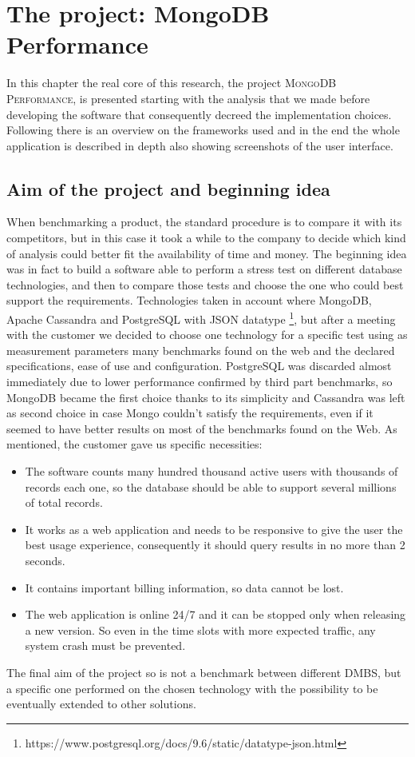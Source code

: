 \chapter{The project: MongoDB Performance}
\label{cha:3}
In this chapter the real core of this research, the project \textsc{MongoDB Performance}, is presented starting with the analysis  that we made before developing the software that consequently decreed the implementation choices.
Following there is an overview on the frameworks used and in the end the whole application is described in depth also showing screenshots of the user interface.

\section{Aim of the project and beginning idea}
\label{sec:1}
When benchmarking a product, the standard procedure is to compare it with its competitors, but in this case it took a while to the company to decide which kind of analysis could better fit the availability of time and money.
The beginning idea was in fact to build a software able to perform a stress test on different database technologies, and then to compare those tests and choose the one who could best support the requirements.
Technologies taken in account where MongoDB, Apache Cassandra and PostgreSQL with JSON datatype \footnote{https://www.postgresql.org/docs/9.6/static/datatype-json.html}, but after a meeting with the customer we decided to choose one technology for a specific test using as measurement parameters many benchmarks found on the web and the declared specifications, ease of use and configuration.
PostgreSQL was discarded almost immediately due to lower performance confirmed by third part benchmarks, so MongoDB became the first choice thanks to its simplicity and Cassandra was left as second choice in case Mongo couldn’t satisfy the requirements, even if it seemed to have better results on most of the benchmarks found on the Web. 
As mentioned, the customer gave us specific necessities:
\begin{itemize}
	\item The software counts many hundred thousand active users with thousands of records each one, so the database should be able to support several millions of total records.
	\item It works as a web application and needs to be responsive to give the user the best usage experience, consequently it should query results in no more than 2 seconds.
	\item It contains important billing information, so data cannot be lost.
	\item The web application is online 24/7 and it can be stopped only when releasing a new version. So even in the time slots with more expected traffic, any system crash must be prevented.
\end{itemize}
The final aim of the project so is not a benchmark between different DMBS, but a specific one performed on the chosen technology with the possibility to be eventually extended to other solutions.


